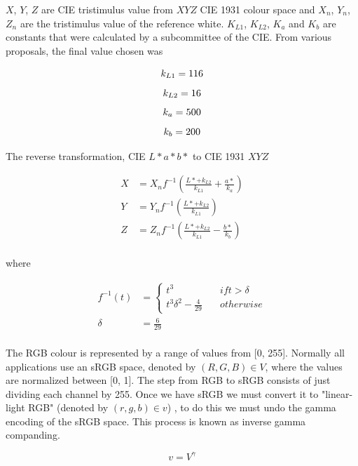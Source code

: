 \documentclass[titlepage,12pt]{report}
\begin{document}
$X$, $Y$, $Z$ are CIE tristimulus value from $XYZ$ CIE 1931 colour space and $X_n$, $Y_n$, $Z_n$ are the tristimulus value of the reference white. $K_{L1}$, $K_{L2}$, $K_a$ and $K_b$ are constants that were calculated by a subcommittee of the CIE. From various proposals, the final value chosen was

\[ k_{L1} = 116 \\ \]
\[ k_{L2} = 16  \\ \]
\[ k_{a} = 500  \\ \]
\[ k_{b} = 200  \\ \]

The reverse transformation, CIE $L*a*b*$ to CIE 1931 $XYZ$

\begin{equation} 
\begin{split}
X & = X_n f^{-1} \left( \frac{L* + k_{L2}}{k_{L1}} + \frac{a*}{k_a} \right) \\
Y & = Y_n f^{-1} \left( \frac{L* + k_{L2}}{k_{L1}} \right) \\
Z & = Z_n f^{-1} \left( \frac{L* + k_{L2}}{k_{L1}} - \frac{b*}{k_b} \right) \\
\end{split}
\end{equation}

where

\begin{equation}
\begin{split}
f^{-1}(t) & = 
\begin{cases}
	t^3 &\quad if t > \delta\\
	t^3 \delta^2 - \frac{4}{29} & \quad otherwise
\end{cases} \\
\delta & = \frac{6}{29} \\
\end{split}
\end{equation}

The RGB colour is represented by a range of values from [0, 255]. Normally all applications use an sRGB space, denoted by $(R,G,B) \in V$, where the values are normalized between [0, 1]. The step from RGB to sRGB consists of just dividing each channel by 255. Once we have sRGB we must convert it to "linear-light RGB" (denoted by $(r,g,b) \in v$) , to do this we must undo the gamma encoding of the sRGB space. This process is known as inverse gamma companding.

\begin{equation}
v = V^\gamma
\end{equation}
\end{document}
